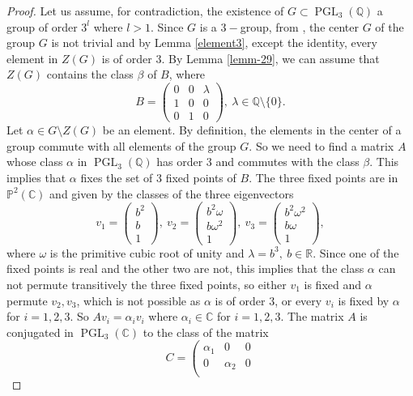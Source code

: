 \documentclass[leqno,12pt]{amsart} %
\newcommand{\Q}{\ensuremath{\mathbb{Q} }}
\newcommand{\R}{\ensuremath{\mathbb{R}}}
\newcommand{\C}{\ensuremath{\mathbb{C} }}
\newcommand{\p}{\ensuremath{\mathbb{P} }}
\DeclareMathOperator{\PGL}{PGL}
\begin{document}
\begin{proof}
    Let us assume, for contradiction, the existence of $G\subset\PGL _3(\Q )$ a group of order $3^l$ where $l> 1$. 
    Since $G$ is a $3-$group, from \cite[Proposition 3.9]{MR2330890}, the center $G$ of the group $G$ is not trivial and by Lemma \ref{element3}, except the identity, every element in $Z(G)$ is of order $3$. By Lemma \ref{lemm-29}, we can assume that $Z(G)$ contains the class $\beta$ of $B$, where 
    \[B=\left(\begin{matrix}
       0&0  & \lambda \\
          1&0  &0\\
           0&1 &0
    \end{matrix}\right),~\lambda\in\Q \setminus\{0\}.\]
    Let $\alpha\in G\setminus Z(G)$ be an element. By definition, the elements in the center of a group commute with all elements of the group $G$. So we need to find a matrix $A$ whose class $\alpha$ in $\PGL _3(\Q )$ has order $3$ and commutes with the class $\beta$. This implies that $\alpha$ fixes the set of $3$ fixed points of $B$. The three fixed points are in $\p^2(\C )$ and given by the classes of the three eigenvectors
\[v_1=\left(\begin{matrix}
    b^2\\b\\1
\end{matrix}\right),~v_2=\left(\begin{matrix}
    b^2 \omega\\b\omega^2\\1
\end{matrix}\right),~v_3=\left(\begin{matrix}
    b^2 \omega^2\\b\omega\\1
\end{matrix}\right),\]
where $\omega$ is the primitive cubic root of unity and $\lambda=b^3,~b\in\R $. Since one of the fixed points is real and the other two are not, this implies that the class $\alpha$ can not permute transitively the three fixed points, so either $v_1$ is fixed and $\alpha$ permute $v_2,v_3$, which is not possible as $\alpha$ is of order $3$, or every $v_i$ is fixed by $\alpha$ for $i=1,2,3$. So $Av_i=\alpha_i v_i$ where $\alpha_i\in\C $ for $i=1,2,3$. The matrix $A$ is conjugated in $\PGL _3(\C )$ to the class of the matrix
 \[C=\left(\begin{matrix}
       \alpha_1&0  & 0 \\
          0& \alpha_2 &0\\

\end{matrix}\]
\end{proof}
\end{document}
